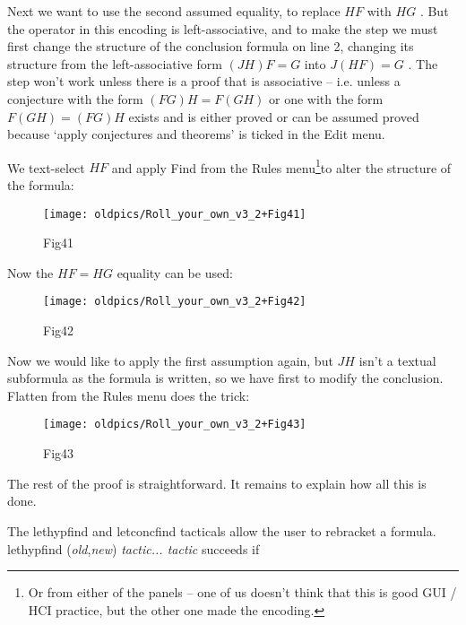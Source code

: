 \documentclass[11pt]{book}
\begin{document}
Next we want to use the second assumed equality, to replace $HF$ with $HG$ . But the {\textbullet} operator in this encoding is left-associative, and to make the step we must first change the structure of the conclusion formula on line 2, changing its structure from the left-associative form $(JH)F=G$ into $J(HF)=G$ . The step won't work unless there is a proof that {\textbullet} is associative -- i.e. unless a conjecture with the form $(FG)H=F(GH)$ or one with the form $F(GH)=(FG)H$ exists and is either proved or can be assumed proved because `apply conjectures and theorems' is ticked in the Edit menu.


We text-select $HF$ and apply Find from the Rules menu\footnote{Or from either of the panels -- one of us doesn't think that this is good GUI / HCI practice, but the other one made the encoding.}to alter the structure of the formula:

\begin{figure}[htbp] \begin{center} \texttt{[image: oldpics/Roll\_your\_own\_v3\_2+Fig41]} \caption{Fig41} \end{center} \end{figure}


Now the $HF=HG$ equality can be used:

\begin{figure}[htbp] \begin{center} \texttt{[image: oldpics/Roll\_your\_own\_v3\_2+Fig42]} \caption{Fig42} \end{center} \end{figure}


Now we would like to apply the first assumption again, but $JH$ isn't a textual subformula as the formula is written, so we have first to modify the conclusion. Flatten from the Rules menu does the trick:

\begin{figure}[htbp] \begin{center} \texttt{[image: oldpics/Roll\_your\_own\_v3\_2+Fig43]} \caption{Fig43} \end{center} \end{figure}


The rest of the proof is straightforward. It remains to explain how all this is done.


The lethypfind and letconcfind tacticals allow the user to rebracket a formula. lethypfind (\textit{old},\textit{new}) \textit{tactic... tactic} succeeds if
\end{document}
